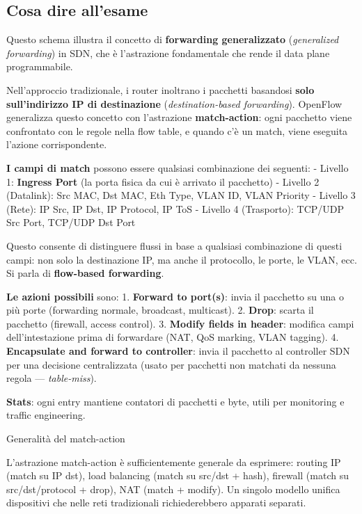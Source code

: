\documentclass[
  italian,
  openany]{book}
\begin{document}
\subsection{Cosa dire all'esame}\label{cosa-dire-allesame-6}

Questo schema illustra il concetto di \textbf{forwarding generalizzato}
(\emph{generalized forwarding}) in SDN, che è l'astrazione fondamentale
che rende il data plane programmabile.

Nell'approccio tradizionale, i router inoltrano i pacchetti basandosi
\textbf{solo sull'indirizzo IP di destinazione} (\emph{destination-based
forwarding}). OpenFlow generalizza questo concetto con l'astrazione
\textbf{match-action}: ogni pacchetto viene confrontato con le regole
nella flow table, e quando c'è un match, viene eseguita l'azione
corrispondente.

\textbf{I campi di match} possono essere qualsiasi combinazione dei
seguenti: - Livello 1: \textbf{Ingress Port} (la porta fisica da cui è
arrivato il pacchetto) - Livello 2 (Datalink): Src MAC, Dst MAC, Eth
Type, VLAN ID, VLAN Priority - Livello 3 (Rete): IP Src, IP Dst, IP
Protocol, IP ToS - Livello 4 (Trasporto): TCP/UDP Src Port, TCP/UDP Dst
Port

Questo consente di distinguere flussi in base a qualsiasi combinazione
di questi campi: non solo la destinazione IP, ma anche il protocollo, le
porte, le VLAN, ecc. Si parla di \textbf{flow-based forwarding}.

\textbf{Le azioni possibili} sono: 1. \textbf{Forward to port(s)}: invia
il pacchetto su una o più porte (forwarding normale, broadcast,
multicast). 2. \textbf{Drop}: scarta il pacchetto (firewall, access
control). 3. \textbf{Modify fields in header}: modifica campi
dell'intestazione prima di forwardare (NAT, QoS marking, VLAN tagging).
4. \textbf{Encapsulate and forward to controller}: invia il pacchetto al
controller SDN per una decisione centralizzata (usato per pacchetti non
matchati da nessuna regola --- \emph{table-miss}).

\textbf{Stats}: ogni entry mantiene contatori di pacchetti e byte, utili
per monitoring e traffic engineering.

\begin{callouttip}{Generalità del match-action}

L'astrazione match-action è sufficientemente generale da esprimere:
routing IP (match su IP dst), load balancing (match su src/dst + hash),
firewall (match su src/dst/protocol + drop), NAT (match + modify). Un
singolo modello unifica dispositivi che nelle reti tradizionali
richiederebbero apparati separati.

\end{callouttip}
\end{document}
